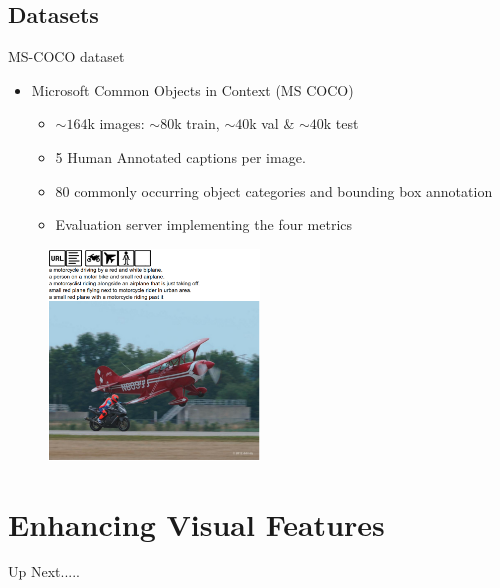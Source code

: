 \documentclass{beamer}
\begin{document}
\subsection{Datasets}
\begin{frame}{MS-COCO dataset}
\begin{itemize}
    \item Microsoft Common Objects in Context (MS COCO)
       \begin{itemize}
            \item $\sim164$k images: $\sim80$k train, $\sim40$k val \& $\sim40$k test 
            \item 5 Human Annotated captions per image.
            \item 80 commonly occurring object categories and bounding box annotation
            \item Evaluation server implementing the four metrics 
       \end{itemize}
\end{itemize}\vspace{-3mm}
    \begin{figure}[h]
        \centering
        \includegraphics[width=0.5\textwidth]{images/Coco_sample.png}
        \vfill
    \end{figure}
\end{frame}
\section{Enhancing Visual Features}
\begin{frame}{Up Next.....}
\tableofcontents[currentsection] 
\end{frame}
\end{document}
